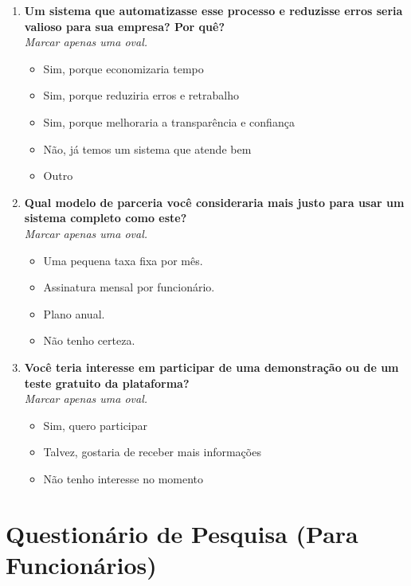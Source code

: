 \begin{apendicesenv}
\begin{enumerate}
  \item \textbf{Um sistema que automatizasse esse processo e reduzisse erros seria valioso para sua empresa? Por quê?} \\
        \textit{Marcar apenas uma oval.}
        \begin{itemize}
          \item Sim, porque economizaria tempo
          \item Sim, porque reduziria erros e retrabalho
          \item Sim, porque melhoraria a transparência e confiança
          \item Não, já temos um sistema que atende bem
          \item Outro
        \end{itemize}

  \item \textbf{Qual modelo de parceria você consideraria mais justo para usar um sistema completo como este?} \\
        \textit{Marcar apenas uma oval.}
        \begin{itemize}
          \item Uma pequena taxa fixa por mês.
          \item Assinatura mensal por funcionário.
          \item Plano anual.
          \item Não tenho certeza.
        \end{itemize}

  \item \textbf{Você teria interesse em participar de uma demonstração ou de um teste gratuito da plataforma?} \\
        \textit{Marcar apenas uma oval.}
        \begin{itemize}
          \item Sim, quero participar
          \item Talvez, gostaria de receber mais informações
          \item Não tenho interesse no momento
        \end{itemize}
\end{enumerate}

\chapter{Questionário de Pesquisa (Para Funcionários)}
\label{apendice:pesquisa-funcionarios}


\end{apendicesenv}
